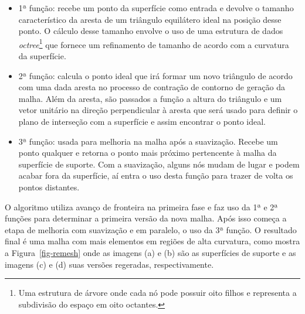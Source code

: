 \renewcommand{\labelitemi}{•}
\begin{itemize}
  \item 1ª função: recebe um ponto da superfície como entrada e devolve o tamanho característico da aresta de um triângulo equilátero ideal na posição desse ponto. O cálculo desse tamanho envolve o uso de uma estrutura de dados \textit{octree}\footnote{Uma estrutura de árvore onde cada nó pode possuir oito filhos e representa a subdivisão do espaço em oito octantes\cite{Donald}.} que fornece um refinamento de tamanho de acordo com a curvatura da superfície.
  \item 2ª função: calcula o ponto ideal que irá formar um novo triângulo de acordo com uma dada aresta no processo de contração de contorno de geração da malha. Além da aresta, são passados a função a altura do triângulo e um vetor unitário na direção perpendicular à aresta que será usado para definir o plano de interseção com a superfície e assim encontrar o ponto ideal.
  \item 3ª função: usada para melhoria na malha após a suavização. Recebe um ponto qualquer e retorna o ponto mais próximo pertencente à malha da superfície de suporte. Com a suavização, alguns nós mudam de lugar e podem acabar fora da superfície, aí entra o uso desta função para trazer de volta os pontos distantes. 
\end{itemize}

O algoritmo utiliza avanço de fronteira na primeira fase e faz uso da 1ª e 2ª funções para determinar a primeira versão da nova malha. Após isso começa a etapa de melhoria com suavização e em paralelo, o uso da 3ª função\cite{Miranda}. O resultado final é uma malha com mais elementos em regiões de alta curvatura, como mostra a Figura~\ref{fig-remesh} onde as imagens (a) e (b) são as superfícies de suporte e as imagens (c) e (d) suas versões regeradas, respectivamente.

